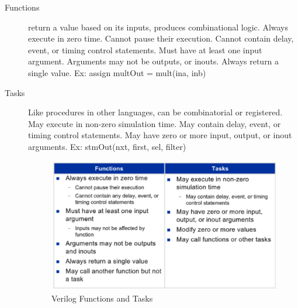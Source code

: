 \begin{description}
\item[Functions] return a value based on its inputs, produces combinational logic. Always execute in zero time. Cannot pause their execution. Cannot contain delay, event, or timing control statements. Must have at least one input argument. Arguments may not be outputs, or inouts. Always return a single value. Ex: assign multOut = mult(ina, inb)

\item[Tasks] Like procedures in other languages, can be combinatorial or registered. May execute in non-zero simulation time. May contain delay, event, or timing control statements. May have zero or more input, output, or inout arguments. Ex: stmOut(nxt, first, sel, filter)

\begin{figure}[H]
	\begin{center}
		\includegraphics[width=5in]{images/VerilogFuncTasks.png}
		\caption{Verilog Functions and Tasks}
		\label{VerilogFuncTasks}
	\end{center}
\end{figure}


\end{description}
